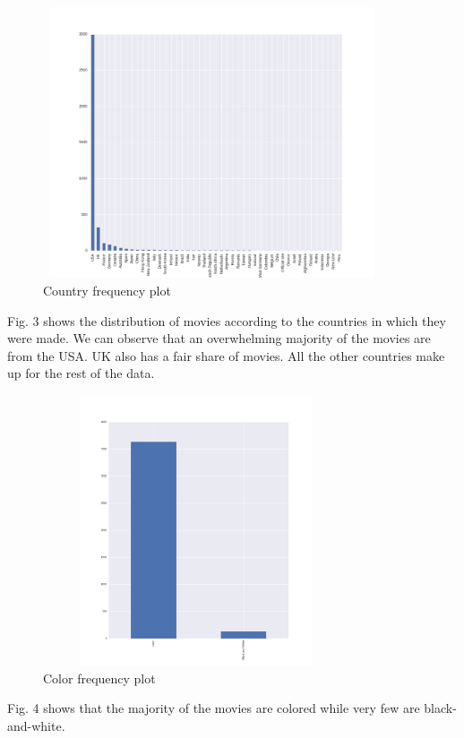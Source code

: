 \documentclass[conference]{IEEEtran}
\begin{document}
\begin{figure}[H]
  \centering	
  \captionsetup{justification=centering}
  \includegraphics[height=8cm, width=10cm, trim={20mm 0mm 10mm 20mm},clip]{../visualizations/Country-Histogram.png}
  \caption{Country frequency plot}
  \label{fig:fig3}
\end{figure}
Fig. 3 shows the distribution of movies according to the countries in which they were made. We can observe that an overwhelming majority of the movies are from the USA. UK also has a fair share of movies. All  the other countries make up for the rest of the data.

\begin{figure}[H]
  \centering	
  \captionsetup{justification=centering}
  \includegraphics[height=8cm, width=9cm, trim={30mm 0mm 20mm 0mm},clip]{../visualizations/Colour-Histogram}
  \caption{Color frequency plot}
  \label{fig:fig4}
\end{figure}
Fig. 4 shows that the majority of the movies are colored while very few are black-and-white.
\end{document}
